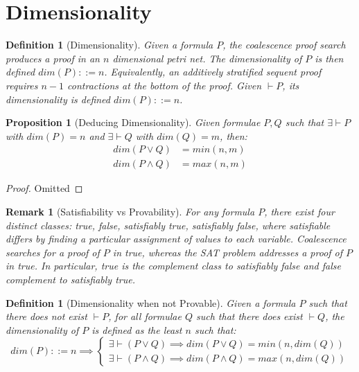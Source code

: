 \documentclass{article}
\def\defeq{::=}
\theoremstyle{indented}
\newtheorem{definition}[sec-ctr]{Definition}
\newtheorem{proposition}[sec-ctr]{Proposition}
\newtheorem*{remark*}{Remark}
\begin{document}


    \section{Dimensionality}
        
        \begin{definition}[Dimensionality]
            Given a formula $P$, the coalescence proof search produces a proof in an $n$ dimensional petri net.
            The dimensionality of $P$ is then defined $dim(P) \defeq n$.
            Equivalently, an additively stratified sequent proof requires $n - 1$ contractions at the bottom of the proof.
            Given $\vdash P$, its dimensionality is defined $dim(P) \defeq n$.
        \end{definition}

        \begin{proposition}[Deducing Dimensionality]
            Given formulae $P, Q$ such that $\exists \vdash P$ with $dim(P) = n$ and $\exists \vdash Q$ with $dim(Q) = m$, then:
            \begin{align*}
                dim(P \vee Q) &= min(n, m) \\
                dim(P \wedge Q) &= max(n, m)
            \end{align*}
        \end{proposition}

        \begin{proof}
            Omitted
        \end{proof}


        \begin{remark*}[Satisfiability vs Provability]
            For any formula $P$, there exist four distinct classes: \textit{true, false, satisfiably true, satisfiably false}, where satisfiable differs by finding a particular assignment of values to each variable.
            Coalescence searches for a proof of $P$ in \textit{true}, whereas the SAT problem addresses a proof of $P$ in \textit{true}.
            In particular, \textit{true} is the complement class to \textit{satisfiably false} and \textit{false} complement to \textit{satisfiably true}. %
        \end{remark*}
        
        
        \begin{definition}[Dimensionality when not Provable]
            Given a formula $P$ such that there does not exist $\vdash P$, for all formulae $Q$ such that there does exist $\vdash Q$, the dimensionality of $P$ is defined as the least $n$ such that:
            \begin{equation*}
                dim(P) \defeq n \implies 
                \begin{cases}
                    \exists \vdash (P \vee Q) \implies dim(P \vee Q) = min(n, dim(Q)) \\
                    \exists \vdash (P \wedge Q) \implies dim(P \wedge Q) = max(n, dim(Q))
                \end{cases}
            \end{equation*}
        \end{definition}
\end{document}

